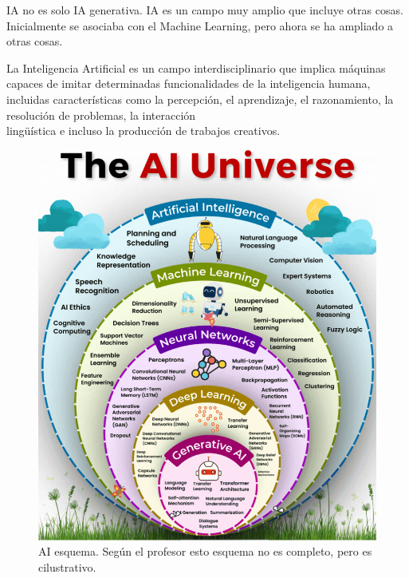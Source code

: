 \begin{paracol}{2}
   \colfill
   IA no es solo IA generativa. IA es un campo muy amplio que incluye otras cosas. Inicialmente se asociaba con el Machine Learning, pero ahora se ha ampliado a otras cosas.
   
   La Inteligencia Artificial es un campo interdisciplinario que implica máquinas capaces de imitar determinadas funcionalidades de la inteligencia humana, incluidas características como la percepción, el aprendizaje, el razonamiento, la resolución de problemas, la interacción\\lingüística e incluso la producción de trabajos creativos.
   \colfill

   \switchcolumn
   
   \begin{figure}[htbp]
      \centering
      \includegraphics{images/01/AI.png}
      \caption{AI esquema. Según el profesor esto esquema no es completo, pero es cilustrativo.}
      \label{fig:01/AI}
   \end{figure}
\end{paracol}



